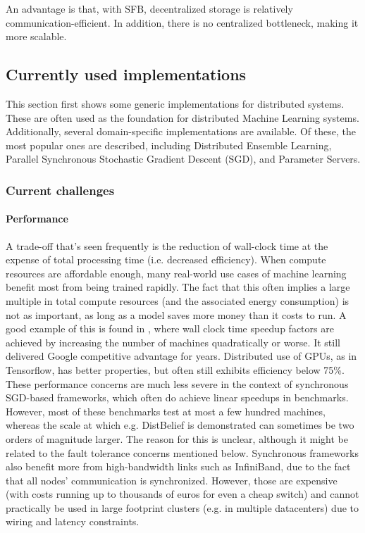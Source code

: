 \begin{itemize}
	An advantage is that, with SFB, decentralized storage is relatively communication-efficient. In addition, there is no centralized bottleneck, making it more scalable.
\end{itemize}










\subsection{Currently used implementations}
This section first shows some generic implementations for distributed systems. These are often used as the foundation for distributed Machine Learning systems. Additionally, several domain-specific implementations are available. Of these, the most popular ones are described, including Distributed Ensemble Learning, Parallel Synchronous Stochastic Gradient Descent (SGD), and Parameter Servers.



\subsubsection{Current challenges}
\paragraph{Performance}

A trade-off that’s seen frequently is the reduction of wall-clock time at the expense of total processing time (i.e. decreased efficiency). When compute resources are affordable enough, many real-world use cases of machine learning benefit most from being trained rapidly. The fact that this often implies a large multiple in total compute resources (and the associated energy consumption) is not as important, as long as a model saves more money than it costs to run.  A good example of this is found in \citet{DistBelief2012}, where wall clock time speedup factors are achieved by increasing the number of machines quadratically or worse. It still delivered Google competitive advantage for years. Distributed use of GPUs, as in Tensorflow, has better properties, but often still exhibits efficiency below 75\%.
These performance concerns are much less severe in the context of synchronous SGD-based frameworks, which often do achieve linear speedups in benchmarks. However, most of these benchmarks test at most a few hundred machines, whereas the scale at which e.g. DistBelief is demonstrated can sometimes be two orders of magnitude larger. The reason for this is unclear, although it might be related to the fault tolerance concerns mentioned below. Synchronous frameworks also benefit more from high-bandwidth links such as InfiniBand, due to the fact that all nodes' communication is synchronized. However, those are expensive (with costs running up to thousands of euros for even a cheap switch) and cannot practically be used in large footprint clusters (e.g. in multiple datacenters) due to wiring and latency constraints.

